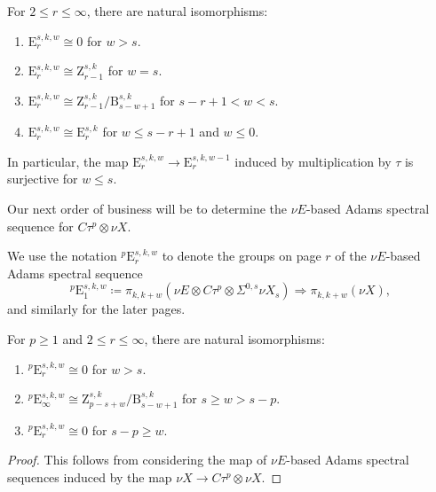 \begin{cor} \label{cor:synth-ASS}
  For $2 \leq r \leq \infty$, there are natural isomorphisms:
  \begin{enumerate}
  \item $\mathrm{E}_r^{s,k,w} \cong 0$ for $w > s$.
  \item $\mathrm{E}_r^{s,k,w} \cong \mathrm{Z}_{r-1}^{s,k}$ for $w = s$.
  \item $\mathrm{E}_r^{s,k,w} \cong \mathrm{Z}_{r-1}^{s,k}/\mathrm{B}_{s-w+1}^{s,k}$ for $s-r+1 < w < s$.
  \item $\mathrm{E}_r^{s,k,w} \cong \mathrm{E}_r^{s,k}$ for $w \leq s-r+1$ and $w \leq 0$.
  \end{enumerate}
    In particular, the map $\mathrm{E}_r ^{s,k,w} \to \mathrm{E}_r ^{s,k,w-1}$ induced by multiplication by $\tau$ is surjective for $w \leq s$.
\end{cor}

Our next order of business will be to determine the $\nu E$-based Adams spectral sequence for $C \tau^p \otimes \nu X$.

\begin{ntn}
    We use the notation ${}^p \mathrm{E}_r ^{s,k,w}$ to denote the groups on page $r$ of the $\nu E$-based Adams spectral sequence
    \[ {}^p\mathrm{E}_1^{s,k,w} \coloneqq \pi_{k,k+w}( \nu E \otimes C\tau^p \otimes \Sigma^{0,s}\nu X_s ) \Longrightarrow \pi_{k,k+w} (\nu X),\]
  and similarly for the later pages.
\end{ntn}

%
\begin{cor} \label{cor:synth-ctau-ASS}
  For $p \geq 1$ and $2 \leq r \leq \infty$, there are natural isomorphisms:
  \begin{enumerate}
  \item ${}^p\mathrm{E}_r^{s,k,w} \cong 0$ for $w > s$.
  \item ${}^p\mathrm{E}_\infty^{s,k,w} \cong \mathrm{Z}_{p-s+w}^{s,k}/\mathrm{B}_{s-w+1}^{s,k}$ for $s \geq w > s-p$.
  \item ${}^p\mathrm{E}_r^{s,k,w} \cong 0$ for $s-p \geq w$.
  \end{enumerate}
\end{cor}

\begin{proof}
    This follows from considering the map of $\nu E$-based Adams spectral sequences induced by the map $\nu X \to C\tau^p \otimes \nu X$. 
\end{proof}


